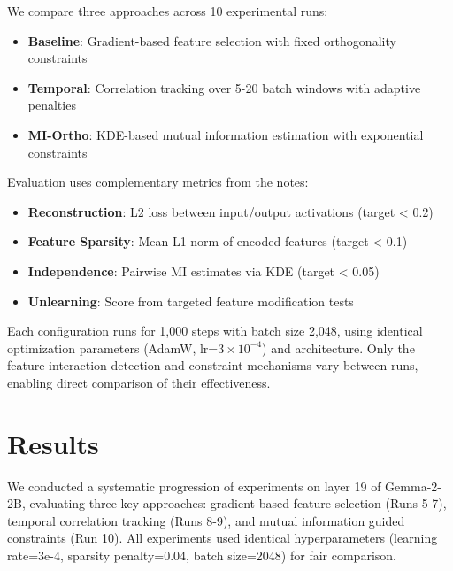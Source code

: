 \documentclass{article} %
\begin{document}
We compare three approaches across 10 experimental runs:
\begin{itemize}
    \item \textbf{Baseline}: Gradient-based feature selection with fixed orthogonality constraints
    \item \textbf{Temporal}: Correlation tracking over 5-20 batch windows with adaptive penalties
    \item \textbf{MI-Ortho}: KDE-based mutual information estimation with exponential constraints
\end{itemize}

Evaluation uses complementary metrics from the notes:
\begin{itemize}
    \item \textbf{Reconstruction}: L2 loss between input/output activations (target < 0.2)
    \item \textbf{Feature Sparsity}: Mean L1 norm of encoded features (target < 0.1)
    \item \textbf{Independence}: Pairwise MI estimates via KDE (target < 0.05)
    \item \textbf{Unlearning}: Score from targeted feature modification tests
\end{itemize}

Each configuration runs for 1,000 steps with batch size 2,048, using identical optimization parameters (AdamW, lr=$3\times10^{-4}$) and architecture. Only the feature interaction detection and constraint mechanisms vary between runs, enabling direct comparison of their effectiveness.

\section{Results}
\label{sec:results}

We conducted a systematic progression of experiments on layer 19 of Gemma-2-2B, evaluating three key approaches: gradient-based feature selection (Runs 5-7), temporal correlation tracking (Runs 8-9), and mutual information guided constraints (Run 10). All experiments used identical hyperparameters (learning rate=3e-4, sparsity penalty=0.04, batch size=2048) for fair comparison.
\end{document}
